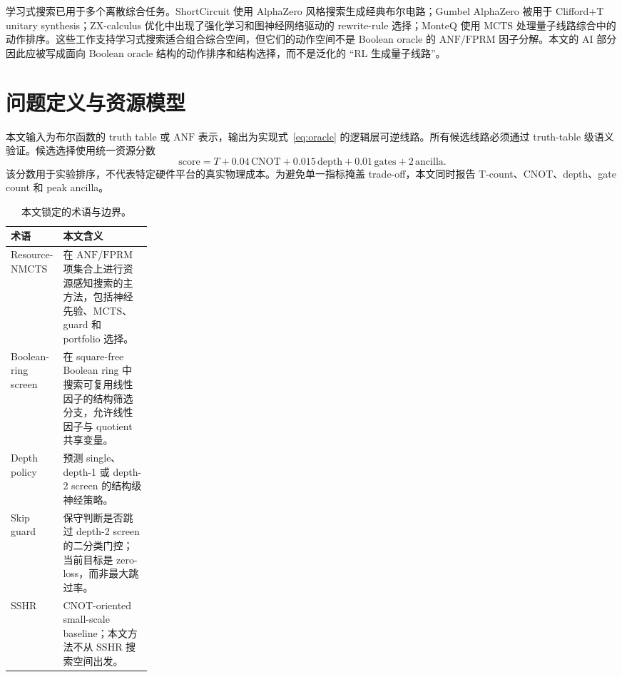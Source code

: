 \documentclass[UTF8,fontset=macnew,11pt]{ctexart}
\newcommand{\method}{Resource-NMCTS}
\newcommand{\screen}{Boolean-ring screen}
\newcommand{\score}{\ensuremath{\mathrm{score}}}
\newcommand{\anf}{\ensuremath{\mathrm{ANF}}}
\newcommand{\fprm}{\ensuremath{\mathrm{FPRM}}}
\newcommand{\mcts}{\ensuremath{\mathrm{MCTS}}}
\begin{document}
学习式搜索已用于多个离散综合任务。ShortCircuit 使用 AlphaZero 风格搜索生成经典布尔电路\cite{tsaras2024shortcircuit}；Gumbel AlphaZero 被用于 Clifford+T unitary synthesis\cite{rietsch2024unitary}；ZX-calculus 优化中出现了强化学习和图神经网络驱动的 rewrite-rule 选择\cite{riu2025rlzx}；MonteQ 使用 \mcts{} 处理量子线路综合中的动作排序\cite{machiya2026monteq}。这些工作支持学习式搜索适合组合综合空间，但它们的动作空间不是 Boolean oracle 的 \anf{}/\fprm{} 因子分解。本文的 AI 部分因此应被写成面向 Boolean oracle 结构的动作排序和结构选择，而不是泛化的 ``RL 生成量子线路''。

\section{问题定义与资源模型}

本文输入为布尔函数的 truth table 或 \anf{} 表示，输出为实现式~\eqref{eq:oracle} 的逻辑层可逆线路。所有候选线路必须通过 truth-table 级语义验证。候选选择使用统一资源分数
\begin{equation}
  \score = T + 0.04\,\mathrm{CNOT} + 0.015\,\mathrm{depth}
         + 0.01\,\mathrm{gates} + 2\,\mathrm{ancilla}.
  \label{eq:score}
\end{equation}
该分数用于实验排序，不代表特定硬件平台的真实物理成本。为避免单一指标掩盖 trade-off，本文同时报告 T-count、CNOT、depth、gate count 和 peak ancilla。

\begin{table}[t]
\centering
\small
\caption{本文锁定的术语与边界。}
\label{tab:terms}
\begin{tabularx}{\linewidth}{>{\raggedright\arraybackslash}p{0.23\linewidth}>{\raggedright\arraybackslash}X}
\toprule
术语 & 本文含义 \\
\midrule
\method{} & 在 \anf{}/\fprm{} 项集合上进行资源感知搜索的主方法，包括神经先验、\mcts{}、guard 和 portfolio 选择。 \\
\screen{} & 在 square-free Boolean ring 中搜索可复用线性因子的结构筛选分支，允许线性因子与 quotient 共享变量。 \\
Depth policy & 预测 single、depth-1 或 depth-2 screen 的结构级神经策略。 \\
Skip guard & 保守判断是否跳过 depth-2 screen 的二分类门控；当前目标是 zero-loss，而非最大跳过率。 \\
SSHR & CNOT-oriented small-scale baseline；本文方法不从 SSHR 搜索空间出发。 \\
\bottomrule
\end{tabularx}
\end{table}
\end{document}
